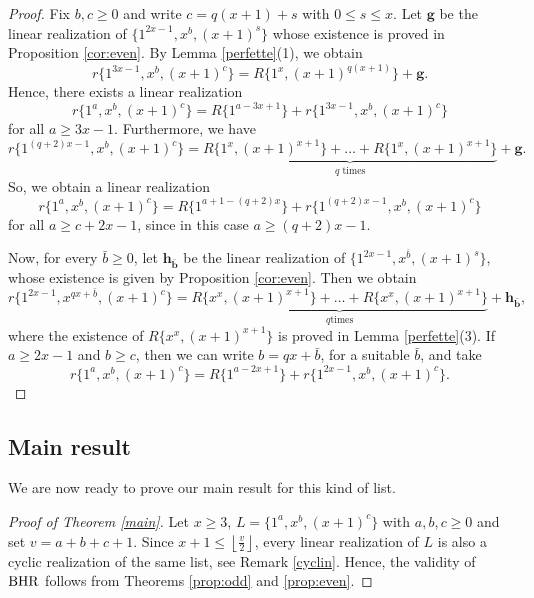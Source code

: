 \documentclass{amsart}
\theoremstyle{definition}
\numberwithin{equation}{section}
\def\BHR{\mathop{\rm BHR}}
\begin{document}
\begin{proof}
Fix $b,c\geq 0$ and write $c=q(x+1)+s$ with $0\leq s\leq x$.
Let $\bm{g}$ be the linear realization  of $\{1^{2x-1}, x^b, (x+1)^s \}$ whose existence is proved in Proposition
\ref{cor:even}.
By Lemma \ref{perfette}(1), we
obtain
$$r\{1^{3x-1},  x^{b}, (x+1)^c \}=R\{1^{x}, (x+1)^{q(x+1)} \} + \bm{g}.$$
Hence, there exists a linear realization
$$r\{1^{a}, x^{b},(x+1)^c \} =R\{1^{a-3x+1}\}+ r\{1^{3x-1}, x^{b}, (x+1)^c \}$$
for all $a\geq 3x-1$. Furthermore,
we have
$$r\{1^{(q+2)x-1},  x^{b},(x+1)^{c} \}=\underbrace{R\{1^{x},(x+1)^{x+1}\}
+\ldots+R\{1^{x},(x+1)^{x+1}\}}_{q \textrm{ times}}+\bm{g}.$$
So,  we obtain a linear realization
$$r\{1^{a}, x^{b},(x+1)^c \} =R\{1^{a+1-(q+2)x}\}+ r\{1^{(q+2)x-1}, x^{b},(x+1)^c \}$$
for all $a\geq c+2x-1$, since in this case $a\geq (q+2)x-1$.


Now, for every $\bar b\geq 0$, let $\bm{h_{\bar b}}$ be the linear realization of $\{1^{2x-1}, x^{\bar b}, (x+1)^s\}$, whose
existence is given by Proposition \ref{cor:even}.
Then we obtain
$$r\{1^{2x-1 },x^{qx+\bar b},  (x+1)^{c} \}=\underbrace{R\{x^x,(x+1)^{x+1}\} +\ldots+R\{x^x,(x+1)^{x+1} \}}_{q \textrm{
times}}+\bm{h_{\bar b}},$$
where the existence of $R\{x^x,(x+1)^{x+1}\}$ is proved in Lemma \ref{perfette}(3).
If $a\geq 2x-1$ and  $b\geq c$, then we can write $b=qx+\bar b$, for a suitable $\bar b$, and  take
$$r\{1^{a}, x^{b},(x+1)^c \} =R\{1^{a-2x+1}\}+ r\{1^{2x-1},  x^{b}, (x+1)^c \}.$$
\end{proof}


\subsection{Main result}\label{Concl}

We are now ready to prove our main result for this kind of list.


\begin{proof}[Proof of Theorem \rm{\ref{main}}]
Let $x\geq 3$, $L=\{1^a,x^b,(x+1)^c\}$ with $a,b,c\geq 0$ and set $v=a+b+c+1$.
Since $x+1\leq  \left \lfloor \frac{v}{2}\right\rfloor$, every linear realization of $L$ is also a cyclic realization of the same list,
see Remark \ref{cyclin}.
Hence, the validity of $\BHR$ follows from Theorems \ref{prop:odd} and \ref{prop:even}.
\end{proof}
\end{document}
